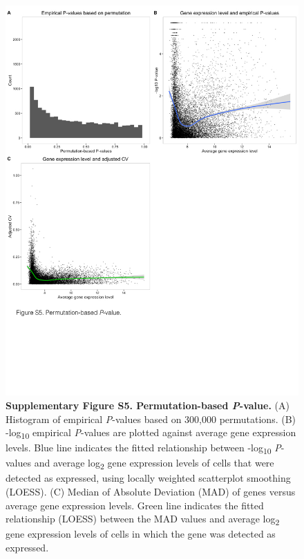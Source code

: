 \begin{figure}[htbp]
\centering
\includegraphics[width=5in]{img/ch04/Figure10.jpeg}
\caption{\textbf{Supplementary Figure S5. Permutation-based
\emph{P}-value.} (A) Histogram of empirical \emph{P}-values based on
300,000 permutations. (B) -log\textsubscript{10} empirical
\emph{P}-values are plotted against average gene expression levels. Blue
line indicates the fitted relationship between -log\textsubscript{10}
\emph{P}-values and average log\textsubscript{2} gene expression levels
of cells that were detected as expressed, using locally weighted
scatterplot smoothing (LOESS). (C) Median of Absolute Deviation (MAD) of
genes versus average gene expression levels. Green line indicates the
fitted relationship (LOESS) between the MAD values and average
log\textsubscript{2} gene expression levels of cells in which the gene
was detected as expressed.}
\end{figure}


